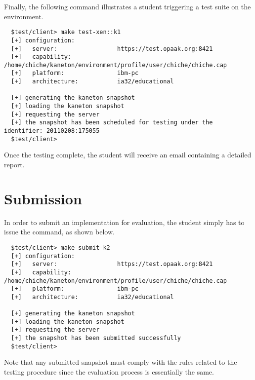 Finally, the following command illustrates a student triggering a test
suite on the  environment.

\begin{verbatim}
  $test/client> make test-xen::k1
  [+] configuration:
  [+]   server:                 https://test.opaak.org:8421
  [+]   capability:             /home/chiche/kaneton/environment/profile/user/chiche/chiche.cap
  [+]   platform:               ibm-pc
  [+]   architecture:           ia32/educational

  [+] generating the kaneton snapshot
  [+] loading the kaneton snapshot
  [+] requesting the server
  [+] the snapshot has been scheduled for testing under the identifier: 20110208:175055
  $test/client> 
\end{verbatim}

Once the testing complete, the student will receive an email containing
a detailed report.

%
%

\section{Submission}

In order to submit an implementation for evaluation, the student simply
has to issue the  command, as shown below.

\begin{verbatim}
  $test/client> make submit-k2
  [+] configuration:
  [+]   server:                 https://test.opaak.org:8421
  [+]   capability:             /home/chiche/kaneton/environment/profile/user/chiche/chiche.cap
  [+]   platform:               ibm-pc
  [+]   architecture:           ia32/educational

  [+] generating the kaneton snapshot
  [+] loading the kaneton snapshot
  [+] requesting the server
  [+] the snapshot has been submitted successfully
  $test/client> 
\end{verbatim}

Note that any submitted snapshot must comply with the rules related to the
testing procedure since the evaluation process is essentially the same.
